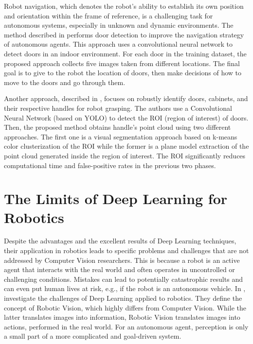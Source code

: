  Robot navigation, which denotes the robot's ability to establish its own position and orientation within the frame of reference, is a challenging task for autonomous systems, especially in unknown and dynamic environments. The method described in \cite{doorsandnavigation} performs door detection to improve the navigation strategy of autonomous agents. This approach uses a convolutional neural network to detect doors in an indoor environment. For each door in the training dataset, the proposed approach collects five images taken from different locations. The final goal is to give to the robot the location of doors, then make decisions of how to move to the doors and go through them.
 
 Another approach, described in \cite{doorcabinet}, focuses on robustly identify doors, cabinets, and their respective handles for robot grasping. The authors use a Convolutional Neural Network (based on YOLO) to detect the ROI (region of interest) of doors. Then, the proposed method obtains handle's point cloud using two different approaches. The first one is a visual segmentation approach based on k-means color clusterization of the ROI while the former is a plane model extraction of the point cloud generated inside the region of interest. The ROI significantly reduces computational time and false-positive rates in the previous two phases.
 
 \section{The Limits of Deep Learning for Robotics}
 
 Despite the advantages and the excellent results of Deep Learning techniques, their application in robotics leads to specific problems and challenges that are not addressed by Computer Vision researchers. This is because a robot is an active agent that interacts with the real world and often operates in uncontrolled or challenging conditions. Mistakes can lead to potentially catastrophic results and can even put human lives at risk, e.g., if the robot is an autonomous vehicle. In \cite{surveydeeplimits}, \citeauthor{surveydeeplimits} investigate the challenges of Deep Learning applied to robotics. They define the concept of Robotic Vision, which highly differs from Computer Vision. While the latter translates images into information, Robotic Vision translates images into actions, performed in the real world. For an autonomous agent, perception is only a small part of a more complicated and goal-driven system. 
 
